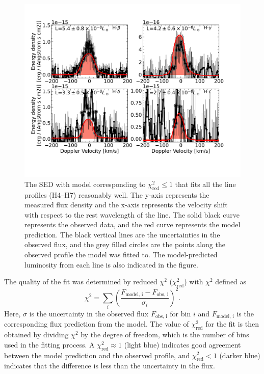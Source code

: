 \documentclass{aa}
\begin{document}
\begin{appendix}
\begin{figure}[!ht]
    \centering
    \includegraphics[width=0.9\linewidth]{BestFit_2m1115_HbHgH6H7_120_14_0.0.pdf}
    \caption{The SED with \cite{aoyama2020, aoyama2021} model corresponding to $\chi_\mathrm{red}^2\leq1$ that fits all the line profiles (H4--H7) reasonably well. The y-axis represents the measured flux density and the x-axis represents the velocity shift with respect to the rest wavelength of the line. The solid black curve represents the observed data, and the red curve represents the model prediction. The black vertical lines are the uncertainties in the observed flux, and the grey filled circles are the points along the observed profile the model was fitted to. The model-predicted luminosity from each line is also indicated in the figure.}
    \label{bestshockmodel}
\end{figure}

 The quality of the fit was determined by reduced $\chi^2$ ($\chi_\mathrm{red}^2$) with $\chi^2$ defined as 
\begin{equation}
    \chi^2 = \sum_i \left(\frac{F_\mathrm{model,\,i} - F_\mathrm{obs,\,i}}{\sigma_i} \right)^2.
\end{equation}
Here, $\sigma$ is the uncertainty in the observed flux $F_\mathrm{obs,\,i}$ for bin $i$ and $F_\mathrm{model,\,i}$ is the corresponding flux prediction from the model. The value of $\chi_\mathrm{red}^2$ for the fit is then obtained by dividing $\chi^2$ by the degree of freedom, which is the number of bins used in the fitting process. A $\chi_\mathrm{red}^2\approx1$ (light blue) indicates good agreement between the model prediction and the observed profile, and $\chi_\mathrm{red}^2 < 1$ (darker blue) indicates that the difference is less than the uncertainty in the flux. 


\end{appendix}
\end{document}
